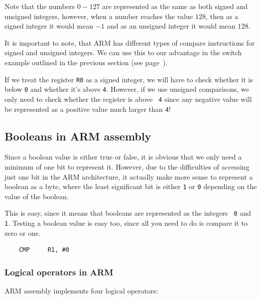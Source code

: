 
Note that the numbers $0-127$ are represented as the same as both signed and
unsigned integers, however, when a number reaches the value $128$, then as a
signed integer it would mean $-1$ and as an unsigned integer it would mean
$128$.

It is important to note, that ARM has different types of compare instructions
for signed and unsigned integers. We can use this to our advantage in the switch
example outlined in the previous section (see page~\pageref{sec:switch}).

If we treat the register {\tt R0} as a signed integer, we will have to check
whether it is below {\tt 0} and whether it's above {\tt 4}. However, if we use
unsigned comparisons, we only need to check whether the register is above {\tt
4} since any negative value will be represented as a positive value much larger
than {\tt 4}!


\subsection{Booleans in ARM assembly}

Since a boolean value is either true or false, it is obvious that we only need a
minimum of one bit to represent it. However, due to the difficulties of
accessing just one bit in the ARM architecture, it actually make more sense to
represent a boolean as a byte, where the least significant bit is either {\tt 1}
or {\tt 0} depending on the value of the boolean.

This is easy, since it means that booleans are represented as the integers {\tt
0} and {\tt 1}. Testing a boolean value is easy too, since all you need to do is
compare it to zero or one.

\begin{verbatim}
	CMP 	R1, #0
\end{verbatim}

\subsubsection{Logical operators in ARM}

ARM assembly implements four logical operators:

